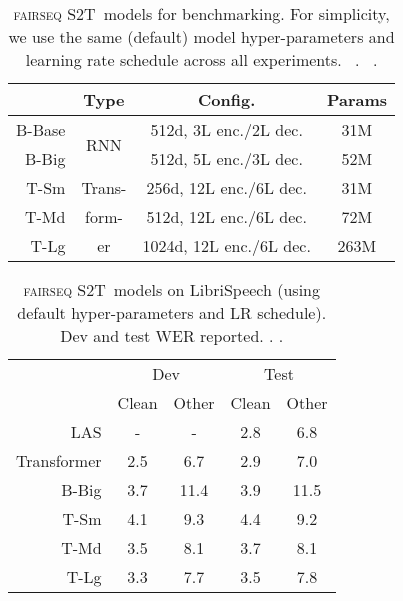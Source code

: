 \documentclass[11pt,a4paper]{article}
\newcommand{\stot}{\textsc{fairseq S2T}}
\begin{document}
\begin{table}[t]
    \centering
    \small
    \begin{tabular}{r|ccc}
    \toprule
     &  Type & Config. & Params \\
    \midrule
    B-Base & \multirow{2}{*}{RNN} & 512d, 3L enc./2L dec. & 31M \\
    B-Big &  & 512d, 5L enc./3L dec. & 52M \\
    \midrule
    T-Sm & Trans- & 256d, 12L enc./6L dec. & 31M \\
    T-Md & form- & 512d, 12L enc./6L dec. & 72M \\
    T-Lg & er & 1024d, 12L enc./6L dec. & 263M \\
    \bottomrule
    \end{tabular}
    \caption{\stot~models for benchmarking. For simplicity, we use the same (default) model hyper-parameters and learning rate schedule across all experiments. ~\citet{berard2018end}.
    ~\citet{vaswani2017attention}.
    }
    \label{tab:models}
\end{table}
 \begin{table}[t]
    \centering
    \small
    \begin{tabular}{r|cc|cc}
    \toprule
    & \multicolumn{2}{c|}{Dev} & \multicolumn{2}{c}{Test} \\
    & Clean & Other & Clean & Other \\
    \midrule
    LAS & - & - & 2.8 & 6.8 \\
Transformer & 2.5 & 6.7 & 2.9 & 7.0 \\
    \midrule
    B-Big & 3.7 & 11.4 & 3.9 & 11.5 \\
    T-Sm & 4.1 & 9.3 & 4.4 & 9.2 \\
    T-Md & 3.5 & 8.1 & 3.7 & 8.1 \\
    T-Lg & 3.3 & 7.7 & 3.5 & 7.8 \\
    \bottomrule
    \end{tabular}
    \caption{\stot~models on LibriSpeech (using default hyper-parameters and LR schedule). Dev and test WER reported.  \citet{park2019specaugment}.  \citet{synnaeve2019end}.}
    \label{tab:librispeech_results}
\end{table} 
\end{document}
